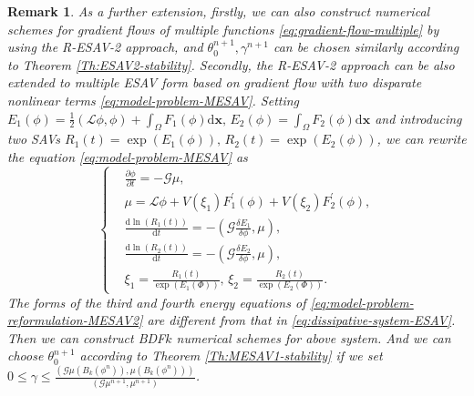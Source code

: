 \documentclass[final,review,onefignum,onetabnum]{siamart190516}
\theoremstyle{plain}
\newtheorem{remark}{\textbf{Remark}}[section]
\begin{document}
\begin{remark}
As a further extension, firstly, we can also construct numerical schemes for gradient flows of multiple functions \eqref{eq:gradient-flow-multiple} by using the R-ESAV-2 approach, and $\theta_0^{n+1}, \gamma^{n+1}$ can be chosen  similarly  according to Theorem \ref{Th:ESAV2-stability}. 
Secondly, the R-ESAV-2 approach can be also extended to multiple ESAV form based on gradient flow with two disparate nonlinear terms \eqref{eq:model-problem-MESAV}. 
 Setting $E_{1}(\phi)=\frac{1}{2}(\mathcal{L} \phi, \phi) + \int_{\Omega} F_{1}(\phi) \mathrm{d} \boldsymbol{x},\, E_{2}(\phi)=\int_{\Omega} F_{2}(\phi) \mathrm{d} \boldsymbol{x}$ and introducing two SAVs $R_{1}(t)=\exp\left(E_{1}(\phi)\right),\, R_{2}(t)=\exp\left(E_{2}(\phi)\right)$, we can rewrite the equation \eqref{eq:model-problem-MESAV} as
\begin{equation}\label{eq:model-problem-reformulation-MESAV2}
	\left\{\begin{aligned}
		& \frac{\partial \phi}{\partial t}=-\mathcal{G} \mu, \\
		& \mu=\mathcal{L} \phi+V(\xi_{1})F_{1}^{\prime}(\phi)+V(\xi_{2})F_{2}^{\prime}(\phi), \\
		& \frac{\mathrm{d}\ln\left(R_{1}(t)\right)}{\mathrm{d}t}=-\left(\mathcal{G}\frac{\delta E_{1}}{\delta \phi}, \mu\right),\\
		& \frac{\mathrm{d}\ln\left(R_{2}(t)\right)}{\mathrm{d}t}=-\left(\mathcal{G}\frac{\delta E_{2}}{\delta \phi}, \mu\right), \\
		& \xi_{1} = \frac{R_{1}(t)}{\exp\left(E_{1}(\Phi)\right)}, \, \xi_{2} = \frac{R_{2}(t)}{\exp\left(E_{2}(\Phi)\right)}.
	\end{aligned}\right.
\end{equation}
The forms of the third and fourth energy equations of \eqref{eq:model-problem-reformulation-MESAV2} are different from that in \eqref{eq:dissipative-system-ESAV}. 
Then we can construct BDF$k$ numerical schemes for above system. 
And we can choose $\theta_0^{n+1}$ according to Theorem \ref{Th:MESAV1-stability} if we set $0 \leq \gamma \leq \frac{\left(\mathcal{G}\mu\left(B_k(\phi^{n})\right), \mu\left(B_k(\phi^{n})\right)\right)}{\left(\mathcal{G} \mu^{n+1}, \mu^{n+1}\right)}$. 
\end{remark}
\end{document}
